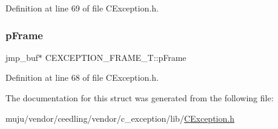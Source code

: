 Definition at line 69 of file C\+Exception.\+h.

\mbox{\label{struct_c_e_x_c_e_p_t_i_o_n___f_r_a_m_e___t_a6c0fa02df976ea39e7182a67a672efe1}} 
\subsubsection{\texorpdfstring{p\+Frame}{pFrame}}
{\footnotesize\ttfamily jmp\+\_\+buf$\ast$ C\+E\+X\+C\+E\+P\+T\+I\+O\+N\+\_\+\+F\+R\+A\+M\+E\+\_\+\+T\+::p\+Frame}



Definition at line 68 of file C\+Exception.\+h.



The documentation for this struct was generated from the following file\+:\begin{DoxyCompactItemize}
\item 
muju/vendor/ceedling/vendor/c\+\_\+exception/lib/\hyperlink{_c_exception_8h}{C\+Exception.\+h}\end{DoxyCompactItemize}
